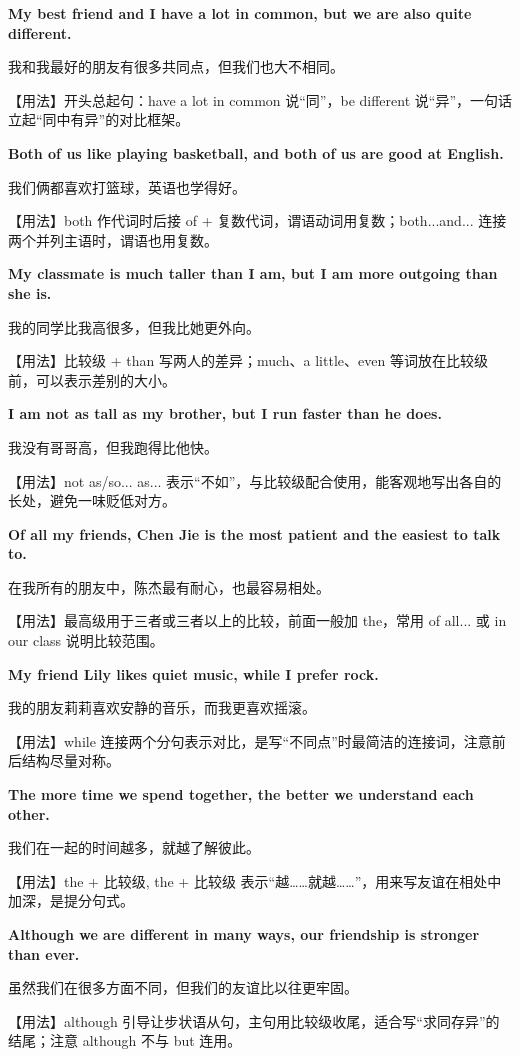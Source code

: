 \documentclass[UTF8,a4paper,11pt,oneside]{ctexbook}
\newcommand{\fansection}[1]{%
  \par\addvspace{2.4ex}%
  \Needspace{6\baselineskip}%
  \noindent{\sffamily\Large\bfseries\color{mainblue}#1}\par
  \nopagebreak
  \addvspace{0.2ex}%
  \noindent{\color{rulelight}\rule{\linewidth}{0.9pt}}\par
  \addvspace{0.9ex}%
  \nobreak
}
\newcommand{\fanpat}[3]{%
  \item{\bfseries #1}\par\nopagebreak
  {\small\color{textgray}#2}\par\nopagebreak
  {\footnotesize\color{accent!90!black}【用法】#3}\par
}
\begin{document}
\fansection{〇、本单元写作常用句型}
\begin{fanpatterns}
\fanpat{My best friend and I have a lot in common, but we are also quite different.}{我和我最好的朋友有很多共同点，但我们也大不相同。}{开头总起句：have a lot in common 说“同”，be different 说“异”，一句话立起“同中有异”的对比框架。}

\fanpat{Both of us like playing basketball, and both of us are good at English.}{我们俩都喜欢打篮球，英语也学得好。}{both 作代词时后接 of + 复数代词，谓语动词用复数；both...and... 连接两个并列主语时，谓语也用复数。}

\fanpat{My classmate is much taller than I am, but I am more outgoing than she is.}{我的同学比我高很多，但我比她更外向。}{比较级 + than 写两人的差异；much、a little、even 等词放在比较级前，可以表示差别的大小。}

\fanpat{I am not as tall as my brother, but I run faster than he does.}{我没有哥哥高，但我跑得比他快。}{not as/so... as... 表示“不如”，与比较级配合使用，能客观地写出各自的长处，避免一味贬低对方。}

\fanpat{Of all my friends, Chen Jie is the most patient and the easiest to talk to.}{在我所有的朋友中，陈杰最有耐心，也最容易相处。}{最高级用于三者或三者以上的比较，前面一般加 the，常用 of all... 或 in our class 说明比较范围。}

\fanpat{My friend Lily likes quiet music, while I prefer rock.}{我的朋友莉莉喜欢安静的音乐，而我更喜欢摇滚。}{while 连接两个分句表示对比，是写“不同点”时最简洁的连接词，注意前后结构尽量对称。}

\fanpat{The more time we spend together, the better we understand each other.}{我们在一起的时间越多，就越了解彼此。}{the + 比较级, the + 比较级 表示“越……就越……”，用来写友谊在相处中加深，是提分句式。}

\fanpat{Although we are different in many ways, our friendship is stronger than ever.}{虽然我们在很多方面不同，但我们的友谊比以往更牢固。}{although 引导让步状语从句，主句用比较级收尾，适合写“求同存异”的结尾；注意 although 不与 but 连用。}

\end{fanpatterns}

\fansection{一、满分范文}
\end{document}
